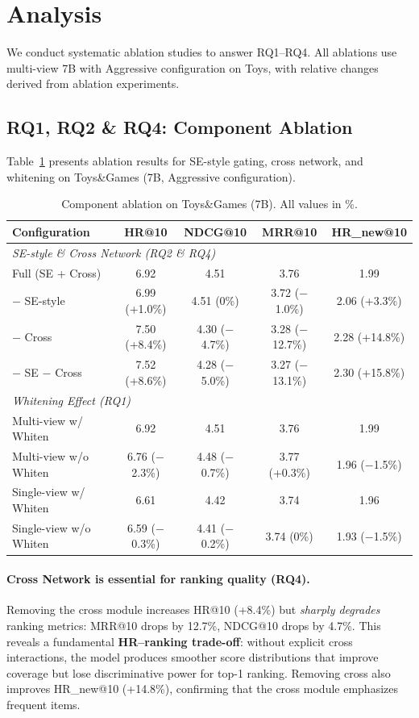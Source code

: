 \section{Analysis}

We conduct systematic ablation studies to answer RQ1--RQ4.
All ablations use multi-view 7B with Aggressive configuration
on Toys, with relative changes derived from ablation
experiments.

\subsection{RQ1, RQ2 \& RQ4: Component Ablation}

Table~\ref{tab:ablation} presents ablation results for SE-style gating,
cross network, and whitening on Toys\&Games (7B, Aggressive configuration).

\begin{table}[t]
\caption{Component ablation on Toys\&Games (7B). All values in \%.}
\label{tab:ablation}
\centering
\scriptsize
\begin{tabular}{@{}lcccc@{}}
\toprule
\textbf{Configuration} & HR@10 & NDCG@10 & MRR@10 & HR\_new@10 \\
\midrule
\multicolumn{5}{l}{\textit{SE-style \& Cross Network (RQ2 \& RQ4)}} \\
Full (SE + Cross) & 6.92 & 4.51 & 3.76 & 1.99 \\
$-$ SE-style & 6.99 (+1.0\%) & 4.51 (0\%) & 3.72 ($-$1.0\%) & 2.06 (+3.3\%) \\
$-$ Cross & 7.50 (+8.4\%) & 4.30 ($-$4.7\%) & 3.28 ($-$12.7\%) & 2.28 (+14.8\%) \\
$-$ SE $-$ Cross & 7.52 (+8.6\%) & 4.28 ($-$5.0\%) & 3.27 ($-$13.1\%) & 2.30 (+15.8\%) \\
\midrule
\multicolumn{5}{l}{\textit{Whitening Effect (RQ1)}} \\
Multi-view w/ Whiten & 6.92 & 4.51 & 3.76 & 1.99 \\
Multi-view w/o Whiten & 6.76 ($-$2.3\%) & 4.48 ($-$0.7\%) & 3.77 (+0.3\%) & 1.96 ($-$1.5\%) \\
Single-view w/ Whiten & 6.61 & 4.42 & 3.74 & 1.96 \\
Single-view w/o Whiten & 6.59 ($-$0.3\%) & 4.41 ($-$0.2\%) & 3.74 (0\%) & 1.93 ($-$1.5\%) \\
\bottomrule
\end{tabular}
\end{table}

\paragraph{Cross Network is essential for ranking quality (RQ4).}
Removing the cross module increases HR@10 (+8.4\%) but \emph{sharply degrades}
ranking metrics: MRR@10 drops by 12.7\%, NDCG@10 drops by 4.7\%.
This reveals a fundamental \textbf{HR--ranking trade-off}: without
explicit cross interactions, the model produces smoother score
distributions that improve coverage but lose discriminative power
for top-1 ranking. Removing cross also improves HR\_new@10 (+14.8\%),
confirming that the cross module emphasizes frequent items.

